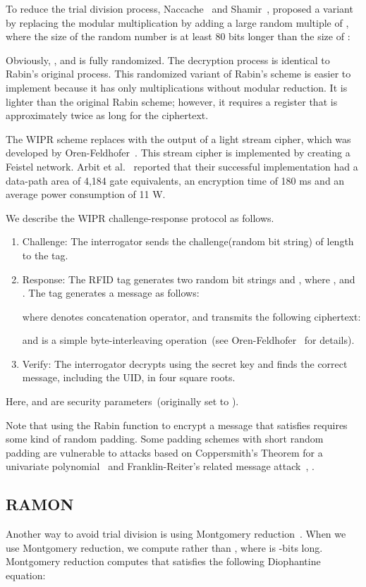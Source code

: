 \documentclass{article}
\newcommand{\BYTEMIX}{\text{\rm BYTE\_MIX}}
\begin{document}
To reduce the trial division process, Naccache~\cite{Naccache} and Shamir~\cite{Shamir}, \cite{Shamir2} 
proposed a variant by replacing the modular multiplication by adding a large random multiple of , 
where the size of the random number  is at least 80 bits longer than the size of :

Obviously, , and  is fully randomized.
The decryption process is identical to Rabin's original process.
This randomized variant of Rabin's scheme is easier to implement because it has only multiplications 
without modular reduction. 
It is lighter than the original Rabin scheme; however, it 
requires a register that is approximately twice as long 
for the ciphertext.

The WIPR scheme replaces  with the output of a light stream cipher, 
which was developed by Oren-Feldhofer~\cite{Oren-Feldhofer}. 
This stream cipher is implemented by creating a Feistel network. 
Arbit et al.~\cite{Implement} reported that 
their successful implementation had a data-path area of 
4,184 gate equivalents, an encryption time of 180 ms and an average power consumption of 11 W.  

We describe the WIPR challenge-response protocol as follows.
\begin{enumerate}
\item Challenge: The interrogator sends the challenge(random bit string)  
of length  to the tag.
\item Response: 
The RFID tag generates two random bit strings  and , where 
, and .
The tag generates a message as follows:

where  denotes concatenation operator, and transmits the following ciphertext:

and {\BYTEMIX} is a simple byte-interleaving 
operation~(see Oren-Feldhofer~\cite{Oren-Feldhofer2} for details).
\item Verify: The interrogator decrypts  using the secret key  and 
finds the correct message, including the UID, in four square roots.
\end{enumerate}
Here,  and  are security parameters~(originally set to ).

Note that using the Rabin function  to encrypt a message  
that satisfies  requires 
some kind of random padding. 
Some padding schemes with short random padding are vulnerable to attacks based on 
Coppersmith's Theorem for a univariate polynomial~\cite{Coppersmith} and 
Franklin-Reiter's related message attack~\cite{FR1}, \cite{FR2}.

\subsection{RAMON}
Another way to avoid trial division is using 
Montgomery reduction~\cite{Mont}.
When we use Montgomery reduction, we 
compute  rather than , 
where  is -bits long.
Montgomery reduction computes  that satisfies the following Diophantine equation:
\end{document}
